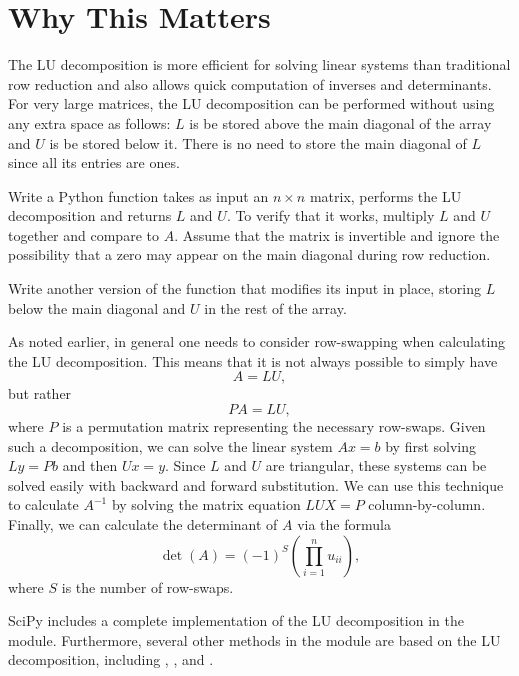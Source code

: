 \section*{Why This Matters}
The LU decomposition is more efficient for solving linear systems than traditional row reduction and also allows quick computation of inverses and determinants.
For very large matrices, the LU decomposition can be performed without using any extra space as follows:
$L$ is be stored above the main diagonal of the array and $U$ is be stored below it.
There is no need to store the main diagonal of $L$ since all its entries are ones.

\begin{problem}
\label{prob:LU}
Write a Python function takes as input an $n\times n$ matrix, performs the LU decomposition and returns $L$ and $U$.
To verify that it works, multiply $L$ and $U$ together and compare to $A$.
Assume that the matrix is invertible and ignore the possibility that a zero may appear on the main diagonal during row reduction.

Write another version of the function that modifies its input in place, storing $L$ below the main diagonal and $U$ in the rest of the array.
\end{problem}

As noted earlier, in general one needs to consider row-swapping when
calculating the LU decomposition. This means that it is not always possible
to simply have
\[
A = LU,
\]
but rather
\[
PA = LU,
\]
where $P$ is a permutation matrix representing the necessary row-swaps. Given such a decomposition, we can solve the linear system $Ax = b$ by
first solving $Ly = Pb$ and then $Ux = y$. Since $L$ and $U$ are triangular,
these systems can be solved easily with backward and forward substitution.
We can use this technique to calculate $A^{-1}$ by solving the matrix
equation $LUX = P$ column-by-column. Finally, we can calculate the
determinant of $A$ via the formula
\[
\det(A) = (-1)^S\left(\displaystyle\prod_{i=1}^nu_{ii}\right),
\]
where $S$ is the number of row-swaps.

SciPy includes a complete implementation of the LU decomposition in the  module.
Furthermore, several other methods in the  module are based on the LU 
decomposition, including , , and .

